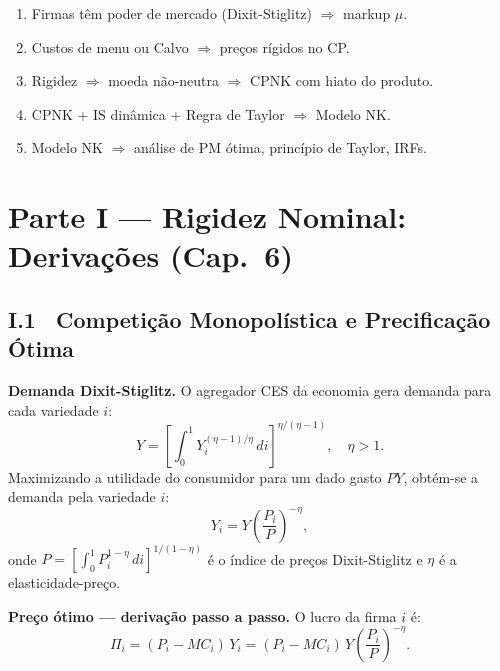 \documentclass[12pt, a4paper]{article}
\begin{document}
\begin{resultbox}[title={Lógica da sequência}]
\begin{enumerate}[leftmargin=1.5em, itemsep=2pt]
  \item Firmas têm poder de mercado (Dixit-Stiglitz) $\Rightarrow$ markup $\mu$.
  \item Custos de menu ou Calvo $\Rightarrow$ preços rígidos no CP.
  \item Rigidez $\Rightarrow$ moeda não-neutra $\Rightarrow$ CPNK com hiato do produto.
  \item CPNK + IS dinâmica + Regra de Taylor $\Rightarrow$ Modelo NK.
  \item Modelo NK $\Rightarrow$ análise de PM ótima, princípio de Taylor, IRFs.
\end{enumerate}
\end{resultbox}


\newpage
\section*{\large\color{cyanrbc} Parte I --- Rigidez Nominal: Derivações (Cap.\ 6)}

\subsection*{I.1 \ Competição Monopolística e Precificação Ótima}

\textbf{Demanda Dixit-Stiglitz.}
O agregador CES da economia gera demanda para cada variedade $i$:
\[
Y = \left[\int_0^1 Y_i^{(\eta-1)/\eta}\,di\right]^{\eta/(\eta-1)},\quad \eta > 1.
\]
Maximizando a utilidade do consumidor para um dado gasto $PY$, obtém-se
a demanda pela variedade $i$:
\begin{equation}
Y_i = Y\!\left(\frac{P_i}{P}\right)^{-\eta},
\label{eq:demand_ds}
\end{equation}
onde $P = \left[\int_0^1 P_i^{1-\eta}\,di\right]^{1/(1-\eta)}$ é o índice de preços
Dixit-Stiglitz e $\eta$ é a elasticidade-preço.

\textbf{Preço ótimo — derivação passo a passo.}
O lucro da firma $i$ é:
\[
\Pi_i = (P_i - MC_i)\,Y_i = (P_i - MC_i)\,Y\!\left(\frac{P_i}{P}\right)^{-\eta}.
\]
\end{document}
